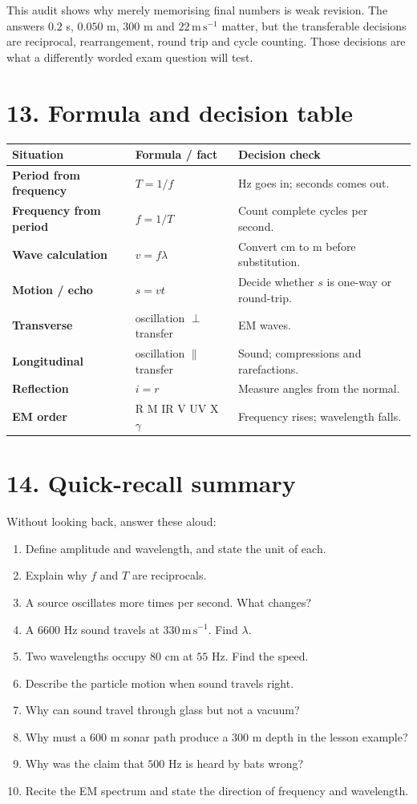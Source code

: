 \documentclass[11pt,a4paper]{article}
\begin{document}
This audit shows why merely memorising final numbers is weak revision. The answers $0.2$ s, $0.050$ m, $300$ m and $22\,\mathrm{m\,s^{-1}}$ matter, but the transferable decisions are reciprocal, rearrangement, round trip and cycle counting. Those decisions are what a differently worded exam question will test.

\section*{13. Formula and decision table}
\begin{tabularx}{\linewidth}{>{\bfseries}p{.25\linewidth}p{.23\linewidth}X}
\toprule Situation & Formula / fact & Decision check\\\midrule
Period from frequency & $T=1/f$ & Hz goes in; seconds comes out.\\
Frequency from period & $f=1/T$ & Count complete cycles per second.\\
Wave calculation & $v=f\lambda$ & Convert cm to m before substitution.\\
Motion / echo & $s=vt$ & Decide whether $s$ is one-way or round-trip.\\
Transverse & oscillation $\perp$ transfer & EM waves.\\
Longitudinal & oscillation $\parallel$ transfer & Sound; compressions and rarefactions.\\
Reflection & $i=r$ & Measure angles from the normal.\\
EM order & R M IR V UV X $\gamma$ & Frequency rises; wavelength falls.\\\bottomrule
\end{tabularx}

\section*{14. Quick-recall summary}
Without looking back, answer these aloud:
\begin{enumerate}
\item Define amplitude and wavelength, and state the unit of each.
\item Explain why $f$ and $T$ are reciprocals.
\item A source oscillates more times per second. What changes?
\item A $6600$ Hz sound travels at $330\,\mathrm{m\,s^{-1}}$. Find $\lambda$.
\item Two wavelengths occupy $80$ cm at $55$ Hz. Find the speed.
\item Describe the particle motion when sound travels right.
\item Why can sound travel through glass but not a vacuum?
\item Why must a $600$ m sonar path produce a $300$ m depth in the lesson example?
\item Why was the claim that $500$ Hz is heard by bats wrong?
\item Recite the EM spectrum and state the direction of frequency and wavelength.
\end{enumerate}
\end{document}
